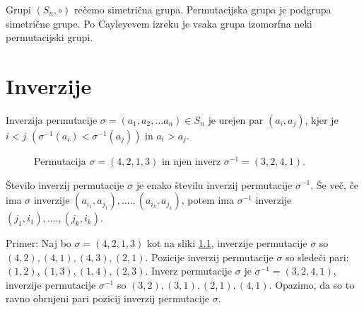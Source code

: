 \documentclass[a4paper, 12pt]{book}
\let\ab\allowbreak
\begin{document}
Grupi $(S_n, \circ)$ rečemo simetrična grupa. Permutacijska grupa je podgrupa simetrične grupe. Po Cayleyevem izreku je vsaka grupa izomorfna neki permutacijski grupi.


\chapter{ Inverzije }

Inverzija permutacije $\sigma = (a_1, a_2,... a_n) \in S_n$ je urejen par $(a_i, a_j)$, kjer je $i < j$ $(\sigma^{-1}(a_i) < \sigma^{-1}(a_j))$ in $a_i > a_j$.

\begin{figure}[h]
    \begin{center}
    \end{center}
    \caption{Permutacija $\sigma = (4, 2, 1, 3)$ in njen inverz $\sigma^{-1} = (3, 2, 4, 1)$.}
    \label{permutacija_4213}
\end{figure}

Število inverzij permutacije $\sigma$ je enako številu inverzij permutacije $\sigma^{-1}$. Še več, če ima $\sigma$ inverzije $(a_{i_1}, a_{j_1}), ...., (a_{i_k}, a_{j_k})$, potem ima $\sigma^{-1}$ inverzije $(j_1, i_1), ...., (j_k, i_k)$.

Primer: Naj bo $\sigma = (4, 2, 1, 3)$ kot na sliki \ref{permutacija_4213}, inverzije permutacije $\sigma$ so $(4, 2), (4, 1), (4, 3), (2, 1)$. Pozicije inverzij permutacije $\sigma$ so sledeči pari: $(1, 2), (1, 3), (1, 4), (2, 3)$. Inverz permutacije $\sigma$ je $\sigma^{-1} = (3, 2, 4, 1)$, inverzije permutacije $\sigma^{-1}$ so $(3, 2), \ab (3, 1), (2, 1), (4, 1)$. Opazimo, da so to ravno obrnjeni pari pozicij inverzij permutacije $\sigma$.
\end{document}
